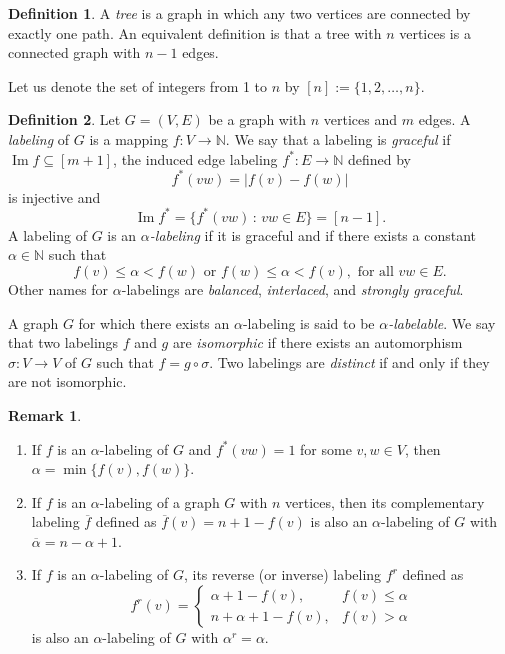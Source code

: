 \documentclass[10pt]{article}
\theoremstyle{definition}
\newtheorem{definition}{Definition}
\newtheorem{remark}{Remark}
\DeclareMathOperator{\Ima}{Im}
\begin{document}
\begin{definition}
  A \textit{tree} is a graph in which any two vertices are connected by exactly one path. An equivalent definition is that a tree with $n$ vertices is a connected graph with $n - 1$ edges.
\end{definition}

Let us denote the set of integers from 1 to $n$ by $[n] := \{1,2,\dots,n\}$.
\begin{definition}
  Let $G = (V, E)$ be a graph with $n$ vertices and $m$ edges.
  A \textit{labeling} of $G$ is a mapping $f: V \rightarrow \mathbb{N}$. We say that a labeling is \textit{graceful} if $\Ima f \subseteq [m + 1]$, the induced edge labeling $f^*: E \rightarrow \mathbb{N}$ defined by
  $$
  f^*(vw) = |f(v) - f(w)|
  $$
  is injective and
  $$\Ima f^* = \{ f^*(vw) \, : \, vw \in E \} = [n-1].$$
  A labeling of $G$ is an \textit{$\alpha$-labeling} if it is graceful and if there exists a constant $\alpha \in \mathbb{N}$ such that
  $$ f(v) \leq \alpha < f(w) \mbox{ or }  f(w) \leq \alpha < f(v), \mbox{ for all } vw \in E.
  $$
  Other names for $\alpha$-labelings are \textit{balanced}, \textit{interlaced}, and \textit{strongly graceful}.
\end{definition}
A graph $G$ for which there exists an $\alpha$-labeling is said to be \textit{$\alpha$-labelable}. We say that two labelings $f$ and $g$ are \textit{isomorphic} if there exists an automorphism $\sigma: V \rightarrow V$ of $G$ such that $f = g \circ \sigma$. Two labelings are \textit{distinct} if and only if they are not isomorphic.

\begin{remark}  \cite{R77}
  \label{remark:alpha-labeling-properties}
  \begin{enumerate}
    \item If $f$ is an $\alpha$-labeling of $G$ and $f^*(vw) = 1$ for some $v, w \in V$, then $\alpha = \min\{f(v), f(w)\}$.
    \item If $f$ is an $\alpha$-labeling of a graph $G$ with $n$ vertices, then its complementary labeling $\overline{f}$ defined as $\overline{f}(v) = n + 1 - f(v)$ is also an $\alpha$-labeling of $G$ with $\overline{\alpha} = n - \alpha + 1$.
    \item If $f$ is an $\alpha$-labeling of $G$, its reverse (or inverse) labeling $f^r$ defined as
      $$
      f^r(v) =
      \begin{cases}
        \alpha + 1 - f(v), & f(v) \leq \alpha \\
        n + \alpha + 1 - f(v), & f(v) > \alpha
      \end{cases}
      $$
      is also an $\alpha$-labeling of $G$ with $\alpha^r = \alpha$.
  \end{enumerate}
\end{remark}
\end{document}
